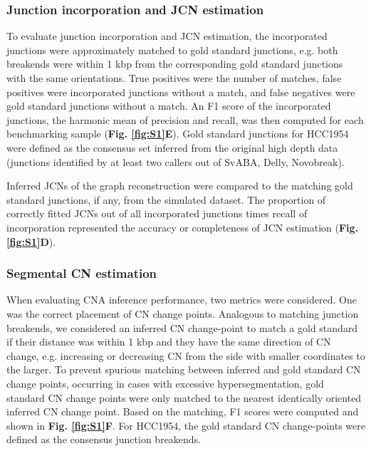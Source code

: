 \documentclass[phd,tocprelim]{cornell}
\begin{document}
\subsubsection*{Junction incorporation and JCN estimation}
To evaluate junction incorporation and JCN estimation, the incorporated junctions were approximately matched to gold standard junctions, e.g. both breakends were within 1 kbp from the corresponding gold standard junctions with the same orientations. True positives were the number of matches, false positives were incorporated junctions without a match, and false negatives were gold standard junctions without a match. An F1 score of the incorporated junctions, the harmonic mean of precision and recall, was then computed for each benchmarking sample (\textbf{Fig. \ref{fig:S1}E}). Gold standard junctions for HCC1954 were defined as the consensus set inferred from the original high depth data (junctions identified by at least two callers out of SvABA, Delly, Novobreak).

Inferred JCNs of the graph reconstruction were compared to the matching gold standard junctions, if any, from the simulated dataset. The proportion of correctly fitted JCNs out of all incorporated junctions times recall of incorporation represented the accuracy or completeness of JCN estimation (\textbf{Fig. \ref{fig:S1}D}).

\subsubsection*{Segmental CN estimation}
When evaluating CNA inference performance, two metrics were considered. One was the correct placement of CN change points. Analogous to matching junction breakends, we considered an inferred CN change-point to match a gold standard if their distance was within 1 kbp and they have the same direction of CN change, e.g. increasing or decreasing CN from the side with smaller coordinates to the larger. To prevent spurious matching between inferred and gold standard CN change points, occurring in cases with excessive hypersegmentation, gold standard CN change points were only matched to the nearest identically oriented inferred CN change point.  Based on the matching, F1 scores were computed and shown in \textbf{Fig. \ref{fig:S1}F}. For HCC1954, the gold standard CN change-points were defined as the consensus junction breakends.

\end{document}
